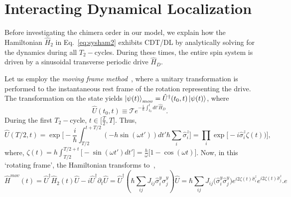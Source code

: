 \documentclass[12pt]{iopart}
\begin{document}
\section{\label{sec:level2} Interacting Dynamical Localization}

Before investigating the chimera order in our model, we explain how the Hamiltonian $\hat{H}_2$ in Eq.~\eqref{eq:sysham2} exhibits CDT/DL by analytically solving for the dynamics during all $T_2-$cycles. During these times,  the entire spin system is driven by a sinusoidal transverse periodic drive $\hat{H}_D$.
	
Let us employ the \textit{moving frame method}~\cite{haldar_dynamical_2021}, where a unitary transformation is performed to the instantaneous rest frame of the rotation representing the drive. The transformation on the state yields $\ket{\psi(t)}_{mov} = \hat{U}^\dagger(t_0,t) \ket{\psi(t)}$, where 
\begin{equation}
    \hat{U}(t_0,t) \equiv \mathcal{T} e^{-\frac{i}{\hbar}\int_{t_0}^{t} dt' \hat{H}_D}.
    \label{eq:rot1}
\end{equation}
During the first $T_2-$cycle, $t \in{\Big[\frac{T}{2}, T \Big]}$. Thus,
\begin{equation}
    \hat{U}\left(T/2,t\right) = \exp \Bigg[-\frac{i}{\hbar}\int_{T/2}^{t+T/2} (-h \sin(\omega t'))dt'\hbar\sum_i\hat{\sigma}^z_i\Bigg]
    = \prod_{i} \exp\Big[-i \hat{\sigma}^z_i\zeta(t))\Big],
\end{equation}
where, $\displaystyle{
    \zeta (t) = h\int_{T/2}^{T/2+t}  \Big[-\sin(\omega t')dt'\Big]=  \frac{h}{\omega}\Big[1-\cos(\omega t)\Big]}$.		
Now, in this `rotating frame', the Hamiltonian transforms to~\cite{haldar_dynamical_2021},
\begin{equation}
    \hat{H}^{mov}(t) = \hat{U}^\dagger \hat{H}_2(t) \hat{U}- i \hat{U}^\dagger \partial_t \hat{U}
    = \hat{U}^\dagger \left(\hbar\sum_{ij}J_{ij}\hat{\sigma}^y_i\hat{\sigma}^y_j\right) \hat{U}
    =\hbar\sum_{ij} J_{ij} \Big(\hat{\sigma}^y_i\hat{\sigma}^y_j\Big) e^{i 2\zeta(t) \hat{\sigma}^z_i}  e^{i 2\zeta(t) \hat{\sigma}^z_j}.
    \label{eq:movham}e
\end{equation}
	
\end{document}
